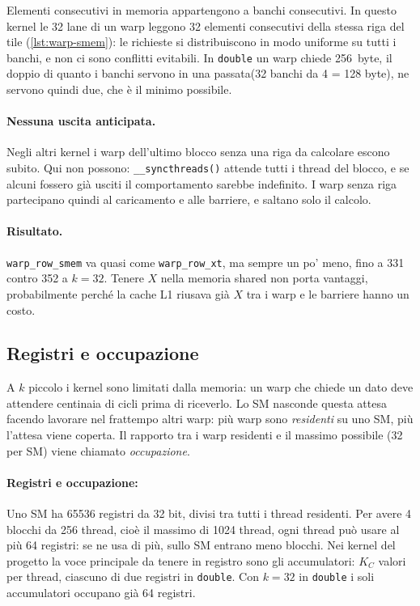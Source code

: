 \documentclass[11pt,a4paper]{article}
\begin{document}
Elementi consecutivi in memoria appartengono a banchi consecutivi. In questo
kernel le 32 lane di un warp leggono 32 elementi consecutivi della stessa riga
del tile (\cref{lst:warp-smem}): le richieste si distribuiscono in modo
uniforme su tutti i banchi, e non ci sono conflitti evitabili. In
\texttt{double} un warp chiede \SI{256}{byte}, il doppio di quanto i banchi
servono in una passata(32 banchi da 4 = 128 byte), ne servono quindi due, che è il minimo possibile.

\paragraph{Nessuna uscita anticipata.} Negli altri kernel i warp dell'ultimo
blocco senza una riga da calcolare escono subito. Qui non possono:
\texttt{\_\_syncthreads()} attende tutti i thread del blocco, e se alcuni
fossero già usciti il comportamento sarebbe indefinito. I warp senza riga
partecipano quindi al caricamento e alle barriere, e saltano solo il calcolo.

\paragraph{Risultato.} \texttt{warp\_row\_smem} va quasi come
\texttt{warp\_row\_xt}, ma sempre un po' meno, fino a 331 contro 352 a
$k = 32$. Tenere $X$ nella memoria shared non porta vantaggi, probabilmente
perché la cache L1 riusava già $X$ tra i warp e le barriere hanno un costo.

\subsection{Registri e occupazione}\label{sec:registri}

A $k$ piccolo i kernel sono limitati dalla memoria: un warp che chiede un dato deve attendere centinaia di cicli
prima di riceverlo. Lo SM nasconde questa attesa facendo lavorare nel
frattempo altri warp: più warp sono \emph{residenti} su uno SM, più l'attesa
viene coperta. Il rapporto tra i warp residenti e il massimo possibile (32 per
SM) viene chiamato \emph{occupazione}.

\paragraph{Registri e occupazione:} Uno SM ha \num{65536} registri
da 32 bit, divisi tra tutti i thread residenti. Per avere 4 blocchi da 256
thread, cioè il massimo di 1024 thread, ogni thread può usare al più 64 registri: se ne usa di più, sullo SM entrano meno blocchi. Nei kernel del
progetto la voce principale da tenere in registro sono gli accumulatori: $K_C$ valori per thread,
ciascuno di due registri in \texttt{double}. Con $k = 32$ in \texttt{double} i
soli accumulatori occupano già 64 registri.
\end{document}
